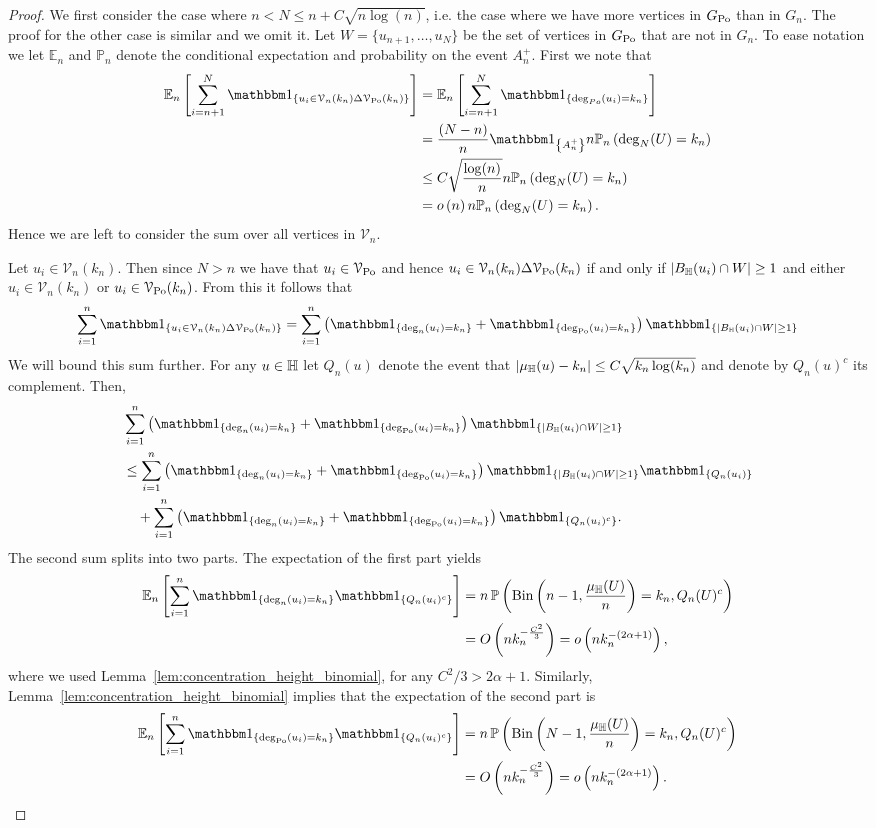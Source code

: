 \begin{proof}
We first consider the case where $n < N \le n + C\sqrt{n \log(n)}$, i.e. the case where we have more vertices in $G_{\text{Po}}$ than in $G_n$. The proof for the other case is similar and we omit it. Let $W = \{u_{n+1}, \dots, u_N\}$ be the set of vertices in $G_{\text{Po}}$ that are not in $G_n$. To ease notation we let $\mathbb{E}_n$ and $\mathbb{P}_n$ denote the conditional expectation and probability on the event $A_n^+$. First we note that
\begin{align*}
	\Expn{\sum_{i = n+1}^N \ind{u_i \in \mathcal{V}_n(k_n) \Delta \VPo(k_n)}}
	&= \Expn{\sum_{i = n+1}^N \ind{\deg_{Po}(u_i) = k_n}} \\
	&= \frac{(N-n)}{n}\ind{A_n^+} n \Probn{\deg_N(U) = k_n} \\
	&\le C \sqrt{\frac{\log(n)}{n}} n \Probn{\deg_N(U) = k_n} \\
	&= \smallO{n} n \Probn{\deg_N(U) = k_n}. 
\end{align*}
Hence we are left to consider the sum over all vertices in $\mathcal{V}_n$.

Let $u_i \in \mathcal{V}_n(k_n)$. Then since $N > n$ we have that $u_i \in \mathcal{V}_{{\mathrm{Po}}}$ and hence $u_i \in \mathcal{V}_n(k_n) \Delta \mathcal{V}_{{\mathrm{Po}}}(k_n)$ if and only if $|B_{\mathbb{H}}(u_i) \cap W| \ge 1$ and either $u_i \in \mathcal{V}_n(k_n)$ or $u_i \in \mathcal{V}_{{\mathrm{Po}}}(k_n)$.
From this it follows that
\[
	\sum_{i = 1}^n \ind{u_i \in \mathcal{V}_n(k_n) \Delta \VPo(k_n)}
	= \sum_{i = 1}^n \left(\ind{\deg_n(u_i) = k_n} + \ind{\deg_\Po(u_i) = k_n} \right)\ind{|B_\H(u_i) \cap W| \ge 1}
\]
We will bound this sum further. For any $u \in \mathbb{H}$ let $Q_n(u)$ denote the event that $|\mu_{\mathbb{H}}(u) - k_n| \le C \sqrt{k_n \log(k_n)}$ and denote by $Q_n(u)^c$ its complement. Then, 
\begin{align*}
	&\sum_{i = 1}^n \left(\ind{\deg_n(u_i) = k_n} + \ind{\deg_\Po(u_i) = k_n} \right)\ind{|B_\H(u_i) \cap W| \ge 1}\\
	&\le \sum_{i = 1}^n \left(\ind{\deg_n(u_i) = k_n} + \ind{\deg_\Po(u_i) = k_n} \right)
		\ind{|B_\H(u_i) \cap W| \ge 1}\ind{Q_n(u_i)}\\
	&\hspace{10pt}+ \sum_{i = 1}^n \left(\ind{\deg_n(u_i) = k_n} + \ind{\deg_\Po(u_i) = k_n} \right)\ind{Q_n(u_i)^c}.
\end{align*}
The second sum splits into two parts. The expectation of the first part yields
\begin{align*}
	\Expn{\sum_{i = 1}^n \ind{\deg_n(u_i) = k_n} \ind{Q_n(u_i)^c}}
	&= n \, \Prob{\mathrm{Bin}\left(n-1, \frac{\mu_\H(U)}{n}\right) = k_n, Q_n(U)^c}\\
	&= \bigO{n k_n^{-\frac{C^2}{3}}} = \smallO{n k_n^{-(2\alpha + 1)}},
\end{align*}
where we used Lemma~\ref{lem:concentration_height_binomial}, for any $C^2/3 > 2\alpha + 1$.
Similarly, Lemma~\ref{lem:concentration_height_binomial} implies that the expectation of the second part is
\begin{align*}
	\Expn{\sum_{i = 1}^n \ind{\deg_\Po(u_i) = k_n} \ind{Q_n(u_i)^c}}
	&= n \, \Prob{\mathrm{Bin}\left(N-1, \frac{\mu_\H(U)}{n}\right) = k_n, Q_n(U)^c}\\
	&= \bigO{n k_n^{-\frac{C^2}{3}}} = \smallO{n k_n^{-(2\alpha + 1)}}.
\end{align*}


\end{proof}
